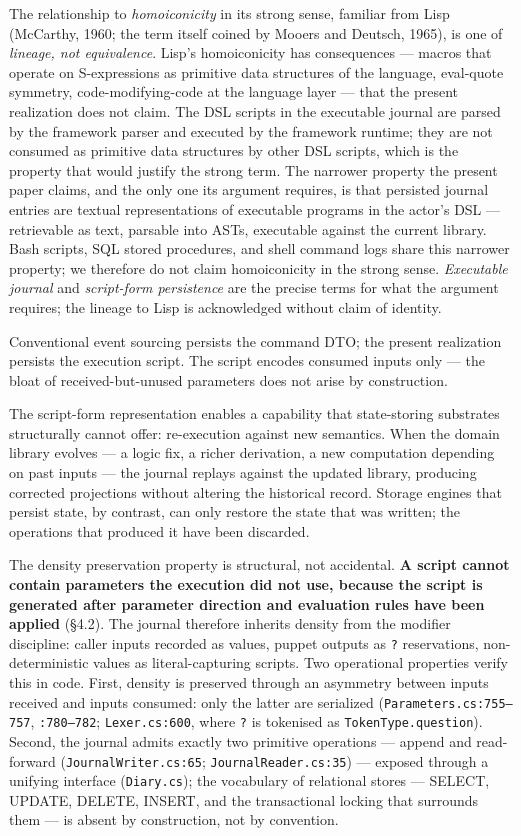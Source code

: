 \documentclass[
]{article}
\let\origtexttt\texttt%
\renewcommand{\texttt}[1]{\origtexttt{\seqsplit{#1}}}%
\let\texttt\origtexttt%
\begin{document}
The relationship to \emph{homoiconicity} in its strong sense, familiar
from Lisp (McCarthy, 1960; the term itself coined by Mooers and Deutsch,
1965), is one of \emph{lineage, not equivalence}. Lisp's homoiconicity
has consequences --- macros that operate on S-expressions as primitive
data structures of the language, eval-quote symmetry,
code-modifying-code at the language layer --- that the present
realization does not claim. The DSL scripts in the executable journal
are parsed by the framework parser and executed by the framework
runtime; they are not consumed as primitive data structures by other DSL
scripts, which is the property that would justify the strong term. The
narrower property the present paper claims, and the only one its
argument requires, is that persisted journal entries are textual
representations of executable programs in the actor's DSL ---
retrievable as text, parsable into ASTs, executable against the current
library. Bash scripts, SQL stored procedures, and shell command logs
share this narrower property; we therefore do not claim homoiconicity in
the strong sense. \emph{Executable journal} and \emph{script-form
persistence} are the precise terms for what the argument requires; the
lineage to Lisp is acknowledged without claim of identity.

Conventional event sourcing persists the command DTO; the present
realization persists the execution script. The script encodes consumed
inputs only --- the bloat of received-but-unused parameters does not
arise by construction.

The script-form representation enables a capability that state-storing
substrates structurally cannot offer: re-execution against new
semantics. When the domain library evolves --- a logic fix, a richer
derivation, a new computation depending on past inputs --- the journal
replays against the updated library, producing corrected projections
without altering the historical record. Storage engines that persist
state, by contrast, can only restore the state that was written; the
operations that produced it have been discarded.

The density preservation property is structural, not accidental.
\textbf{A script cannot contain parameters the execution did not use,
because the script is generated after parameter direction and evaluation
rules have been applied} (§4.2). The journal therefore inherits density
from the modifier discipline: caller inputs recorded as values, puppet
outputs as \texttt{?} reservations, non-deterministic values as
literal-capturing scripts. Two operational properties verify this in
code. First, density is preserved through an asymmetry between inputs
received and inputs consumed: only the latter are serialized
(\texttt{Parameters.cs:755–757}, \texttt{:780–782};
\texttt{Lexer.cs:600}, where \texttt{?} is tokenised as
\texttt{TokenType.question}). Second, the journal admits exactly two
primitive operations --- append and read-forward
(\texttt{JournalWriter.cs:65}; \texttt{JournalReader.cs:35}) --- exposed
through a unifying interface (\texttt{Diary.cs}); the vocabulary of
relational stores --- SELECT, UPDATE, DELETE, INSERT, and the
transactional locking that surrounds them --- is absent by construction,
not by convention.
\end{document}
